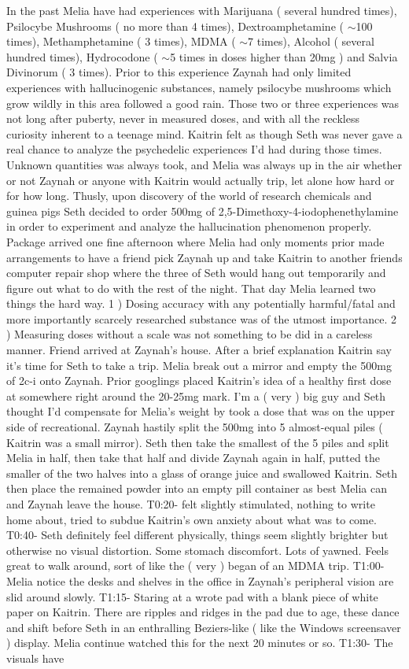 \documentclass[12pt]{book}
\begin{document}
In the past Melia have had experiences with Marijuana ( several hundred times), Psilocybe Mushrooms ( no more than 4 times), Dextroamphetamine ( $\sim$100 times), Methamphetamine ( 3 times), MDMA ( $\sim$7 times), Alcohol ( several hundred times), Hydrocodone ( $\sim$5 times in doses higher than 20mg ) and Salvia Divinorum ( 3 times). Prior to this experience Zaynah had only limited experiences with hallucinogenic substances, namely psilocybe mushrooms which grow wildly in this area followed a good rain. Those two or three experiences was not long after puberty, never in measured doses, and with all the reckless curiosity inherent to a teenage mind. Kaitrin felt as though Seth was never gave a real chance to analyze the psychedelic experiences I'd had during those times. Unknown quantities was always took, and Melia was always up in the air whether or not Zaynah or anyone with Kaitrin would actually trip, let alone how hard or for how long. Thusly, upon discovery of the world of research chemicals and guinea pigs Seth decided to order 500mg of 2,5-Dimethoxy-4-iodophenethylamine in order to experiment and analyze the hallucination phenomenon properly. Package arrived one fine afternoon where Melia had only moments prior made arrangements to have a friend pick Zaynah up and take Kaitrin to another friends computer repair shop where the three of Seth would hang out temporarily and figure out what to do with the rest of the night. That day Melia learned two things the hard way. 1 ) Dosing accuracy with any potentially harmful/fatal and more importantly scarcely researched substance was of the utmost importance. 2 ) Measuring doses without a scale was not something to be did in a careless manner. Friend arrived at Zaynah's house. After a brief explanation Kaitrin say it's time for Seth to take a trip. Melia break out a mirror and empty the 500mg of 2c-i onto Zaynah. Prior googlings placed Kaitrin's idea of a healthy first dose at somewhere right around the 20-25mg mark. I'm a ( very ) big guy and Seth thought I'd compensate for Melia's weight by took a dose that was on the upper side of recreational. Zaynah hastily split the 500mg into 5 almost-equal piles ( Kaitrin was a small mirror). Seth then take the smallest of the 5 piles and split Melia in half, then take that half and divide Zaynah again in half, putted the smaller of the two halves into a glass of orange juice and swallowed Kaitrin. Seth then place the remained powder into an empty pill container as best Melia can and Zaynah leave the house. T0:20- felt slightly stimulated, nothing to write home about, tried to subdue Kaitrin's own anxiety about what was to come. T0:40- Seth definitely feel different physically, things seem slightly brighter but otherwise no visual distortion. Some stomach discomfort. Lots of yawned. Feels great to walk around, sort of like the ( very ) began of an MDMA trip. T1:00- Melia notice the desks and shelves in the office in Zaynah's peripheral vision are slid around slowly. T1:15- Staring at a wrote pad with a blank piece of white paper on Kaitrin. There are ripples and ridges in the pad due to age, these dance and shift before Seth in an enthralling Beziers-like ( like the Windows screensaver ) display. Melia continue watched this for the next 20 minutes or so. T1:30- The visuals have 
\end{document}
